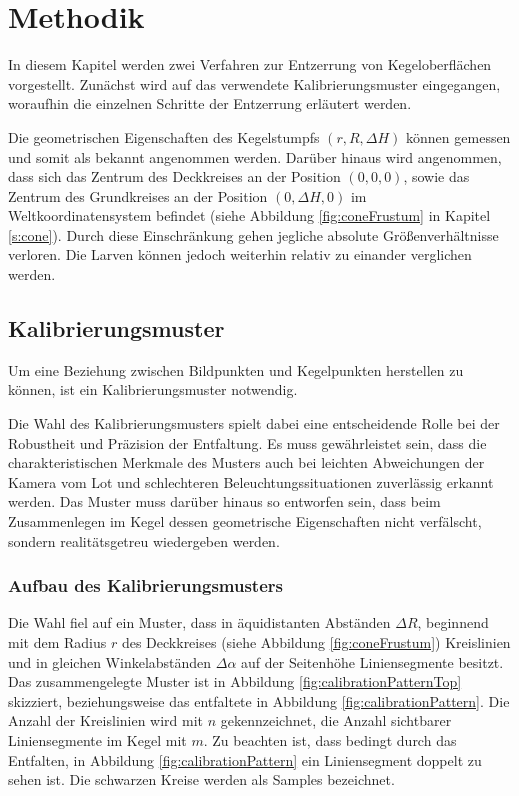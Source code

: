 \chapter{Methodik}
\label{ch:method}
In diesem Kapitel werden zwei Verfahren zur Entzerrung von Kegeloberflächen vorgestellt.
Zunächst wird auf das verwendete Kalibrierungsmuster eingegangen, woraufhin die einzelnen Schritte der Entzerrung erläutert werden.

Die geometrischen Eigenschaften des Kegelstumpfs $(r, R, \Delta H)$ können gemessen und somit als bekannt angenommen werden.
Darüber hinaus wird angenommen, dass sich das Zentrum des Deckkreises an der Position $(0,0,0)$, sowie das Zentrum des Grundkreises an der Position $(0,\Delta H, 0)$ im Weltkoordinatensystem befindet (siehe Abbildung \ref{fig:coneFrustum} in Kapitel \ref{s:cone}). Durch diese Einschränkung gehen jegliche absolute Größenverhältnisse verloren. Die Larven können jedoch weiterhin relativ zu einander verglichen werden.


\section{Kalibrierungsmuster}
\label{s:calibrationPattern}
Um eine Beziehung zwischen Bildpunkten und Kegelpunkten herstellen zu können, ist ein Kalibrierungsmuster notwendig.

Die Wahl des Kalibrierungsmusters spielt dabei eine entscheidende Rolle bei der Robustheit und Präzision der Entfaltung. Es muss gewährleistet sein, dass die charakteristischen Merkmale des Musters auch bei leichten Abweichungen der Kamera vom Lot und schlechteren Beleuchtungssituationen zuverlässig erkannt werden. Das Muster muss darüber hinaus so entworfen sein, dass beim Zusammenlegen im Kegel dessen geometrische Eigenschaften nicht verfälscht, sondern realitätsgetreu wiedergeben werden.

\subsection{Aufbau des Kalibrierungsmusters}
Die Wahl fiel auf ein Muster, dass in äquidistanten Abständen $\Delta R$, beginnend mit dem Radius $r$ des Deckkreises (siehe Abbildung \ref{fig:coneFrustum}) Kreislinien und in gleichen Winkelabständen $\Delta \alpha$ auf der Seitenhöhe Liniensegmente besitzt. Das zusammengelegte Muster ist in Abbildung \ref{fig:calibrationPatternTop} skizziert, beziehungsweise das entfaltete in Abbildung \ref{fig:calibrationPattern}. Die Anzahl der Kreislinien wird mit $n$ gekennzeichnet, die Anzahl sichtbarer Liniensegmente im Kegel mit $m$. Zu beachten ist, dass bedingt durch das Entfalten, in Abbildung \ref{fig:calibrationPattern}  ein Liniensegment doppelt zu sehen ist. Die schwarzen Kreise werden als Samples bezeichnet.

